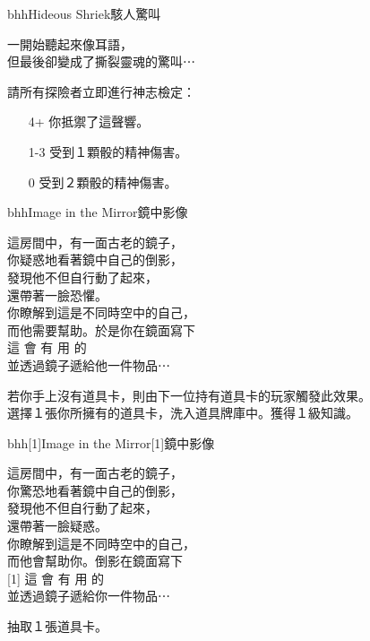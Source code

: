 \linebreak[0]%
\begin{EventCard}{bhh}{Hideous Shriek}{駭人驚叫}
  \begin{CardStory}
    一開始聽起來像耳語，\\
    但最後卻變成了撕裂靈魂的驚叫⋯
  \end{CardStory}
  請所有探險者立即進行神志檢定：
  \begin{itemize}
    \item[4+] 你抵禦了這聲響。
    \item[1-3] 受到１顆骰的精神傷害。
    \item[0] 受到２顆骰的精神傷害。
  \end{itemize}
\end{EventCard}%
\linebreak[0]%
\begin{EventCard}{bhh}{Image in the Mirror}{鏡中影像}
  \begin{CardStory}
    這房間中，有一面古老的鏡子，\\
    你疑惑地看著鏡中自己的倒影，\\
    發現他不但自行動了起來，\\
    還帶著一臉恐懼。\\
    你瞭解到這是不同時空中的自己，\\
    而他需要幫助。於是你在鏡面寫下\\[0.5em]
    { \FontScript 這 \enskip 會 \enskip 有 \enskip 用 \enskip 的 }\\[0.5em]
    並透過鏡子遞給他一件物品⋯
\end{CardStory}
  若你手上沒有道具卡，則由下一位持有道具卡的玩家觸發此效果。\\[0.5em]
  選擇１張你所擁有的道具卡，洗入道具牌庫中。獲得１級知識。\\[0.5em]
\end{EventCard}%
\linebreak[0]%
\begin{EventCard}{bhh}{\scalebox{-1}[1]{Image in the Mirror}}{\scalebox{-1}[1]{鏡中影像}}
  \begin{CardStory}
    這房間中，有一面古老的鏡子，\\
    你驚恐地看著鏡中自己的倒影，\\
    發現他不但自行動了起來，\\
    還帶著一臉疑惑。\\
    你瞭解到這是不同時空中的自己，\\
    而他會幫助你。倒影在鏡面寫下\\[0.5em]
    \scalebox{-1}[1]{ \FontScript 這 \enskip 會 \enskip 有 \enskip 用 \enskip 的 }\\[0.5em]
    並透過鏡子遞給你一件物品⋯
\end{CardStory}
  抽取１張道具卡。\\[0.5em]
\end{EventCard}%
